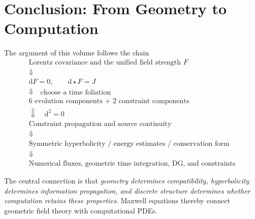 \documentclass[11pt,openany]{book}
\numberwithin{equation}{chapter}
\theoremstyle{definition}
\theoremstyle{remark}
\newcommand{\dd}{\mathrm d}
\begin{document}
\chapter*{Conclusion: From Geometry to Computation}
The argument of this volume follows the chain
\begin{equation*}
\boxed{
\begin{gathered}
\text{Lorentz covariance and the unified field strength }F\\
\Downarrow\\
\dd F=0,\qquad \dd\star F=J\\
\Downarrow\quad\text{choose a time foliation}\\
\text{6 evolution components + 2 constraint components}\\
\Downarrow\quad\dd^2=0\\
\text{Constraint propagation and source continuity}\\
\Downarrow\\
\text{Symmetric hyperbolicity / energy estimates / conservation form}\\
\Downarrow\\
\text{Numerical fluxes, geometric time integration, DG, and constraints}
\end{gathered}}
\end{equation*}

The central connection is that \emph{geometry determines compatibility, hyperbolicity determines information propagation, and discrete structure determines whether computation retains these properties}.
Maxwell equations thereby connect geometric field theory with computational PDEs.

\appendix
\end{document}
